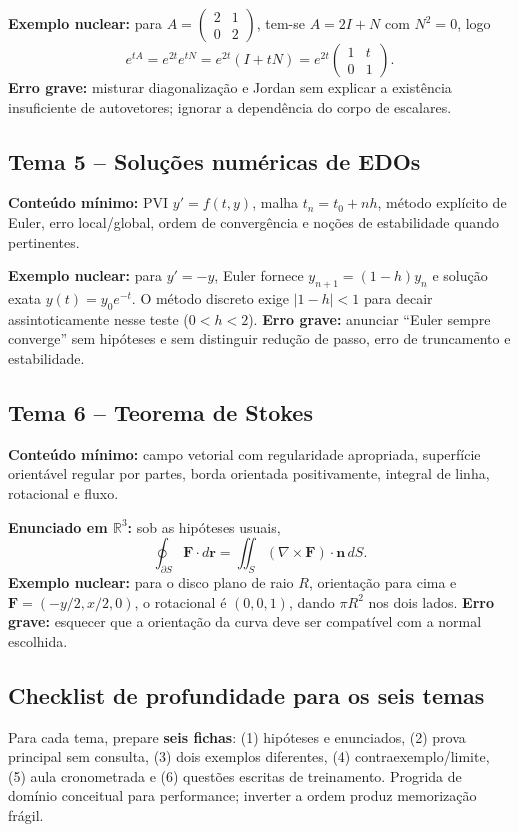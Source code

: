 \documentclass[11pt,a4paper]{article}
\begin{document}
\textbf{Exemplo nuclear:} para $A=\begin{pmatrix}2&1\\0&2\end{pmatrix}$, tem-se $A=2I+N$ com $N^2=0$, logo
\[
 e^{tA}=e^{2t}e^{tN}=e^{2t}(I+tN)
 =e^{2t}\begin{pmatrix}1&t\\0&1\end{pmatrix}.
\]
\textbf{Erro grave:} misturar diagonalização e Jordan sem explicar a existência insuficiente de autovetores; ignorar a dependência do corpo de escalares.

\subsection{Tema 5 -- Soluções numéricas de EDOs}
\textbf{Conteúdo mínimo:} PVI $y'=f(t,y)$, malha $t_n=t_0+nh$, método explícito de Euler, erro local/global, ordem de convergência e noções de estabilidade quando pertinentes.

\textbf{Exemplo nuclear:} para $y'=-y$, Euler fornece $y_{n+1}=(1-h)y_n$ e solução exata $y(t)=y_0e^{-t}$. O método discreto exige $|1-h|<1$ para decair assintoticamente nesse teste ($0<h<2$). \textbf{Erro grave:} anunciar ``Euler sempre converge'' sem hipóteses e sem distinguir redução de passo, erro de truncamento e estabilidade.

\subsection{Tema 6 -- Teorema de Stokes}
\textbf{Conteúdo mínimo:} campo vetorial com regularidade apropriada, superfície orientável regular por partes, borda orientada positivamente, integral de linha, rotacional e fluxo.

\textbf{Enunciado em $\mathbb{R}^3$:} sob as hipóteses usuais,
\[
\oint_{\partial S}\mathbf F\cdot d\mathbf r
=\iint_S (\nabla\times\mathbf F)\cdot\mathbf n\,dS.
\]
\textbf{Exemplo nuclear:} para o disco plano de raio $R$, orientação para cima e $\mathbf F=(-y/2,x/2,0)$, o rotacional é $(0,0,1)$, dando $\pi R^2$ nos dois lados. \textbf{Erro grave:} esquecer que a orientação da curva deve ser compatível com a normal escolhida.

\subsection{Checklist de profundidade para os seis temas}
Para cada tema, prepare \textbf{seis fichas}: (1) hipóteses e enunciados, (2) prova principal sem consulta, (3) dois exemplos diferentes, (4) contraexemplo/limite, (5) aula cronometrada e (6) questões escritas de treinamento. Progrida de domínio conceitual para performance; inverter a ordem produz memorização frágil.
\end{document}

